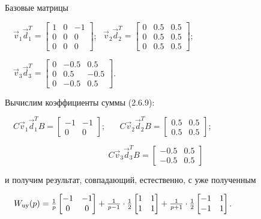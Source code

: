 \documentclass[a4paper]{article}
\newcommand\normalsubformula[1]{\text{\mathversion{normal}$#1$}}
\begin{document}
{\begin{russian}\sffamily
Базовые матрицы
\end{russian}}

{\begin{russian}\sffamily
\ \  $\vec v_1\vec d_1^T=\left[\begin{matrix}1&0&-1\\0&0&0\\0&0&0\end{matrix}\right]$; \  $\vec v_2\vec
d_2^T=\left[\begin{matrix}0&0.5&0.5\\0&0.5&0.5\\0&0.5&0.5\end{matrix}\right]$;
\end{russian}}

{\begin{russian}\sffamily
\ \  $\vec v_3\vec d_3^T=\left[\begin{matrix}0&-0.5&0.5\\0&0.5&-0.5\\0&-0.5&0.5\end{matrix}\right]$.
\end{russian}}

{\begin{russian}\sffamily
Вычислим коэффициенты суммы (2.6.9):
\end{russian}}

{\begin{russian}\sffamily
\ \  $C\vec v_1\vec d_1^TB=\left[\begin{matrix}-1&-1\\0&0\end{matrix}\right]$; \ \ \  $C\vec v_2\vec
d_2^TB=\left[\begin{matrix}0.5&0.5\\0.5&0.5\end{matrix}\right]$;
\end{russian}}

\begin{equation*}
C\vec v_3\vec d_3^TB=\left[\begin{matrix}-0.5&0.5\\-0.5&0.5\end{matrix}\right]
\end{equation*}
{\begin{russian}\sffamily
и получим результат, совпадающий, естественно, с уже полученным
\end{russian}}

{\begin{russian}\sffamily
\ \  $W_{\normalsubformula{\text{uy}}}(p)=\frac 1 p\left[\begin{matrix}-1&-1\\0&0\end{matrix}\right]+\frac 1{p-1}\cdot
\frac 1 2\left[\begin{matrix}1&1\\1&1\end{matrix}\right]+\frac 1{p+1}\cdot \frac 1
2\left[\begin{matrix}-1&1\\-1&1\end{matrix}\right]$.
\end{russian}}
\end{document}
